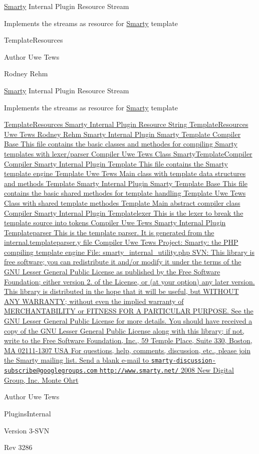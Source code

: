\hyperlink{class_smarty}{Smarty} Internal Plugin Resource Stream

Implements the streams as resource for \hyperlink{class_smarty}{Smarty} template

Template\+Resources \begin{DoxyAuthor}{Author}
Uwe Tews 

Rodney Rehm
\end{DoxyAuthor}
\hyperlink{class_smarty}{Smarty} Internal Plugin Resource Stream

Implements the streams as resource for \hyperlink{class_smarty}{Smarty} template

\hyperlink{}{Template\+Resources Smarty Internal Plugin Resource String  Template\+Resources  Uwe Tews  Rodney Rehm Smarty Internal Plugin Smarty Template Compiler Base This file contains the basic classes and methodes for compiling Smarty templates with lexer/parser  Compiler  Uwe Tews  Class Smarty\+Template\+Compiler  Compiler Smarty Internal Plugin Template This file contains the Smarty template engine  Template  Uwe Tews Main class with template data structures and methods  Template Smarty Internal Plugin Smarty Template Base This file contains the basic shared methodes for template handling  Template  Uwe Tews Class with shared template methodes  Template Main abstract compiler class  Compiler Smarty Internal Plugin Templatelexer This is the lexer to break the template source into tokens  Compiler  Uwe Tews Smarty Internal Plugin Templateparser This is the template parser. It is generated from the internal.\+templateparser.\+y file  Compiler  Uwe Tews Project\+: Smarty\+: the P\+H\+P compiling template engine File\+: smarty\+\_\+internal\+\_\+utility.\+php S\+V\+N\+:  This library is free software; you can redistribute it and/or modify it under the terms of the G\+N\+U Lesser General Public License as published by the Free Software Foundation; either version 2. of the License, or (at your option) any later version. This library is distributed in the hope that it will be useful, but W\+I\+T\+H\+O\+U\+T A\+N\+Y W\+A\+R\+R\+A\+N\+T\+Y; without even the implied warranty of M\+E\+R\+C\+H\+A\+N\+T\+A\+B\+I\+L\+I\+T\+Y or F\+I\+T\+N\+E\+S\+S F\+O\+R A P\+A\+R\+T\+I\+C\+U\+L\+A\+R P\+U\+R\+P\+O\+S\+E. See the G\+N\+U Lesser General Public License for more details. You should have received a copy of the G\+N\+U Lesser General Public License along with this library; if not, write to the Free Software Foundation, Inc., 59 Temple Place, Suite 330, Boston, M\+A 02111-\/1307 U\+S\+A For questions, help, comments, discussion, etc., please join the Smarty mailing list. Send a blank e-\/mail to \href{mailto:smarty-discussion-subscribe@googlegroups.com}{\tt smarty-\/discussion-\/subscribe@googlegroups.\+com}  \href{http://www.smarty.net/}{\tt http\+://www.\+smarty.\+net/}  2008 New Digital Group, Inc.  Monte Ohrt } \begin{DoxyAuthor}{Author}
Uwe Tews
\end{DoxyAuthor}
Plugins\+Internal \begin{DoxyVersion}{Version}
3-\/\+S\+V\+N
\end{DoxyVersion}
\begin{DoxyParagraph}{Rev}
3286 
\end{DoxyParagraph}


